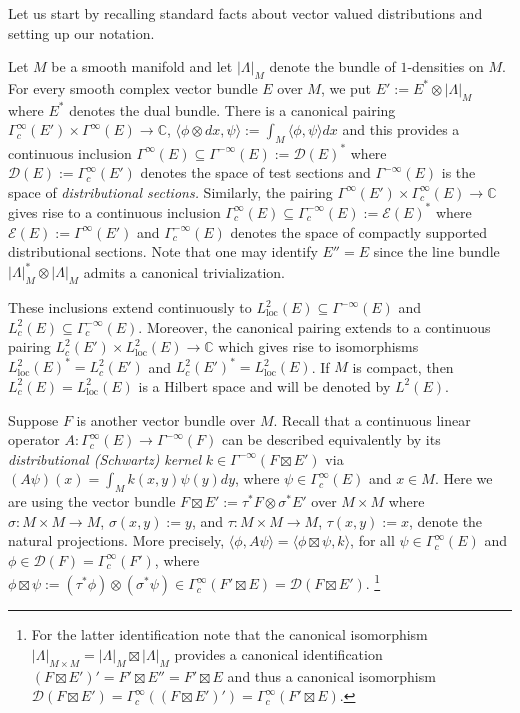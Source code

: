 \documentclass[reqno,12pt]{amsart}
\newcommand\C{\mathbb C}
\newcommand\loc{\textrm{loc}}
\theoremstyle{plain}
\theoremstyle{definition}
\begin{document}
Let us start by recalling standard facts about vector valued distributions and setting up our notation.


Let $M$ be a smooth manifold and let $|\Lambda|_M$ denote the bundle of $1$-densities on $M$.
For every smooth complex vector bundle $E$ over $M$, we put $E':=E^*\otimes|\Lambda|_M$ where $E^*$ denotes the dual bundle. 
There is a canonical pairing $\Gamma^\infty_c(E')\times\Gamma^\infty(E)\to\C$, $\langle\phi\otimes dx,\psi\rangle:=\int_M\langle\phi,\psi\rangle dx$  and this provides a continuous inclusion 
$\Gamma^\infty(E)\subseteq\Gamma^{-\infty}(E):=\mathcal D(E)^*$ where $\mathcal D(E):=\Gamma^\infty_c(E')$ denotes the space of test sections and 
$\Gamma^{-\infty}(E)$ is the space of \emph{distributional sections.} 
Similarly, the pairing $\Gamma^\infty(E')\times\Gamma^\infty_c(E)\to\C$ gives rise to a continuous inclusion $\Gamma^\infty_c(E)\subseteq\Gamma^{-\infty}_c(E):=\mathcal E(E)^*$ where $\mathcal E(E):=\Gamma^\infty(E')$ and $\Gamma^{-\infty}_c(E)$ denotes the space of compactly supported distributional sections.
Note that one may identify $E''=E$ since the line bundle $|\Lambda|_M^*\otimes|\Lambda|_M$ admits a canonical trivialization.


These inclusions  extend  continuously to $L^2_\loc(E)\subseteq\Gamma^{-\infty}(E)$ and $L^2_c(E)\subseteq\Gamma^{-\infty}_c(E)$.
Moreover, the canonical pairing extends to a continuous pairing $L_c^2(E')\times L_\loc^2(E)\to\C$ which gives rise to isomorphisms $L_\loc^2(E)^*=L_c^2(E')$ and $L_c^2(E')^*=L_\loc^2(E)$.
If $M$ is compact, then $L^2_c(E)=L^2_\loc(E)$ is a Hilbert space and will be denoted by $L^2(E)$.


Suppose $F$ is another vector bundle over $M$.
Recall that a continuous linear operator $A\colon\Gamma^\infty_c(E)\to\Gamma^{-\infty}(F)$ can be described equivalently by its \emph{distributional (Schwartz) kernel} $k\in\Gamma^{-\infty}(F\boxtimes E')$ via $(A\psi)(x)=\int_Mk(x,y)\psi(y)dy$, where $\psi\in\Gamma^\infty_c(E)$ and $x\in M$.
Here we are using the vector bundle $F\boxtimes E':=\tau^*F\otimes\sigma^*E'$ over $M\times M$ where $\sigma\colon M\times M\to M$, $\sigma(x,y):=y$, and $\tau\colon M\times M\to M$, $\tau(x,y):=x$, denote the natural projections.
More precisely, $\langle\phi,A\psi\rangle=\langle\phi\boxtimes\psi,k\rangle$, for all $\psi\in\Gamma_c^\infty(E)$ and $\phi\in\mathcal D(F)=\Gamma^\infty_c(F')$, 
where $\phi\boxtimes\psi:=(\tau^*\phi)\otimes(\sigma^*\psi)\in\Gamma^\infty_c(F'\boxtimes E)=\mathcal D(F\boxtimes E')$.
\footnote{For the latter identification note that the canonical isomorphism $|\Lambda|_{M\times M}=|\Lambda|_M\boxtimes|\Lambda|_M$ provides a canonical identification 
$(F\boxtimes E')'=F'\boxtimes E''=F'\boxtimes E$ and thus a canonical isomorphism $\mathcal D(F\boxtimes E')=\Gamma_c^\infty((F\boxtimes E')')=\Gamma^\infty_c(F'\boxtimes E)$.}
\end{document}
